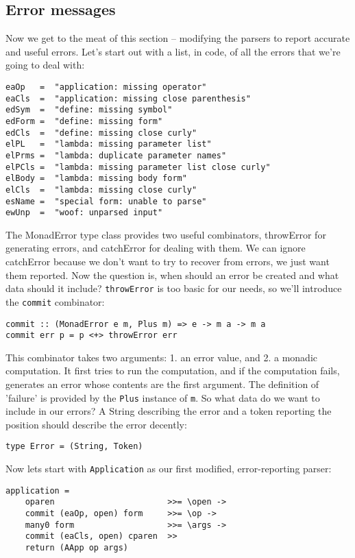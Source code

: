 \documentclass{tmr}
\begin{document}
\subsection{Error messages}
Now we get to the meat of this section -- modifying the parsers to report accurate and useful errors.
Let's start out with a list, in code, of all the errors that we're going to deal with:
\begin{verbatim}
eaOp   =  "application: missing operator"
eaCls  =  "application: missing close parenthesis"
edSym  =  "define: missing symbol"
edForm =  "define: missing form"
edCls  =  "define: missing close curly"
elPL   =  "lambda: missing parameter list"
elPrms =  "lambda: duplicate parameter names"
elPCls =  "lambda: missing parameter list close curly"
elBody =  "lambda: missing body form"
elCls  =  "lambda: missing close curly"
esName =  "special form: unable to parse"
ewUnp  =  "woof: unparsed input"
\end{verbatim}
The MonadError type class provides two useful combinators, throwError for generating errors, and 
catchError for dealing with them.  We can ignore catchError because we don't want to try to recover
from errors, we just want them reported.  Now the question is, when should an error be created
and what data should it include?  \verb+throwError+ is too basic for our needs, so we'll introduce
the \verb+commit+ combinator:
\begin{verbatim}
commit :: (MonadError e m, Plus m) => e -> m a -> m a
commit err p = p <+> throwError err
\end{verbatim}
This combinator takes two arguments: 1. an error value, and 2. a monadic computation.  It first tries
to run the computation, and if the computation fails, generates an error whose contents are the first
argument.  The definition of 'failure' is provided by the \verb+Plus+ instance of \verb+m+.
So what data do we want to include in our errors?  A String describing the error and a token reporting
the position should describe the error decently:
\begin{verbatim}
type Error = (String, Token)
\end{verbatim}
Now lets start with \verb+Application+ as our first modified, error-reporting parser:
\begin{verbatim}
application =
    oparen                       >>= \open ->
    commit (eaOp, open) form     >>= \op ->
    many0 form                   >>= \args ->
    commit (eaCls, open) cparen  >>
    return (AApp op args)
\end{verbatim}
\end{document}
